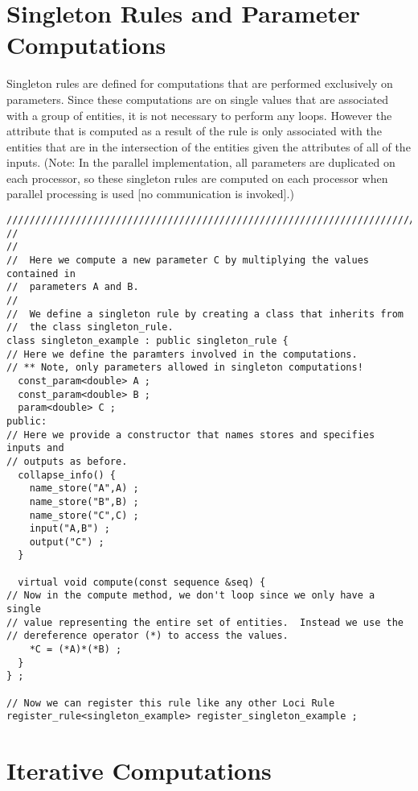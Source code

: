 \documentclass[10pt,epsf]{book}
\begin{document}


\section{Singleton Rules and Parameter Computations}

Singleton rules are defined for computations that are performed
exclusively on parameters.  Since these computations are on single
values that are associated with a group of entities, it is not
necessary to perform any loops.  However the attribute that is
computed as a result of the rule is only associated with the entities
that are in the intersection of the entities given the attributes of
all of the inputs.  (Note:  In the parallel implementation, all
parameters are duplicated on each processor, so these singleton rules
are computed on each processor when parallel processing is used [no
communication is invoked].)

\begin{verbatim}
//////////////////////////////////////////////////////////////////////////////
//
//
//  Here we compute a new parameter C by multiplying the values contained in
//  parameters A and B.
//  
//  We define a singleton rule by creating a class that inherits from 
//  the class singleton_rule.
class singleton_example : public singleton_rule {
// Here we define the paramters involved in the computations.
// ** Note, only parameters allowed in singleton computations!
  const_param<double> A ;
  const_param<double> B ;
  param<double> C ;
public:
// Here we provide a constructor that names stores and specifies inputs and
// outputs as before.
  collapse_info() {
    name_store("A",A) ;
    name_store("B",B) ;
    name_store("C",C) ;
    input("A,B") ;
    output("C") ;
  }

  virtual void compute(const sequence &seq) {
// Now in the compute method, we don't loop since we only have a single
// value representing the entire set of entities.  Instead we use the
// dereference operator (*) to access the values.
    *C = (*A)*(*B) ;
  }
} ;

// Now we can register this rule like any other Loci Rule
register_rule<singleton_example> register_singleton_example ;
\end{verbatim}

\section{Iterative Computations}
\end{document}
